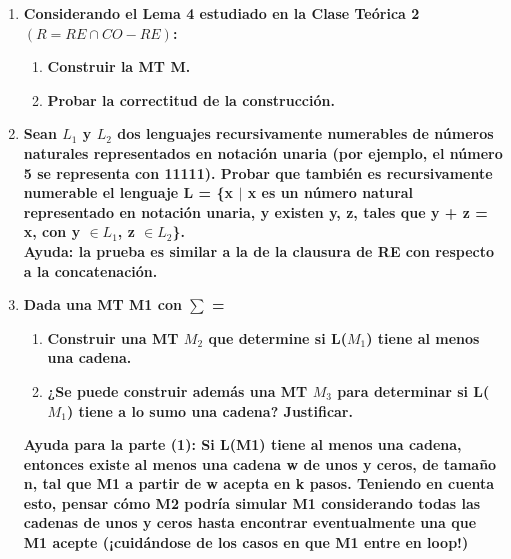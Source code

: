 \documentclass{article}
\begin{document}
\begin{enumerate}
\item \textbf{Considerando el Lema 4 estudiado en la Clase Teórica 2 $(R = RE \cap CO-RE)$:}

\begin{enumerate}
\item \textbf{ Construir la MT M.}
\item \textbf{Probar la correctitud de la construcción.} 
\end{enumerate}

\item \textbf{Sean $L_1$ y $L_2$ dos lenguajes recursivamente numerables de números naturales
representados en notación unaria (por ejemplo, el número 5 se representa con 11111). Probar
que también es recursivamente numerable el lenguaje L = \{x $\mid$ x es un número natural
representado en notación unaria, y existen y, z, tales que y + z = x, con y $\in L_1$, z $\in L_2$\}.\\}
\textbf{Ayuda: la prueba es similar a la de la clausura de RE con respecto a la concatenación. }
 
\item \textbf{ Dada una MT M1 con $\sum$ = }

\begin{enumerate}
\item \textbf{ Construir una MT $M_2$ que determine si L($M_1$) tiene al menos una cadena.}
\item \textbf{ ¿Se puede construir además una MT $M_3$ para determinar si L($M_1$) tiene a lo sumo una
cadena? Justificar.
}
\end{enumerate}

\textbf{Ayuda para la parte (1): Si L(M1) tiene al menos una cadena, entonces existe al menos una
cadena w de unos y ceros, de tamaño n, tal que M1 a partir de w acepta en k pasos. Teniendo
en cuenta esto, pensar cómo M2 podría simular M1 considerando todas las cadenas de unos y
ceros hasta encontrar eventualmente una que M1 acepte (¡cuidándose de los casos en que M1
entre en loop!)}

\end{enumerate}
\end{document}
